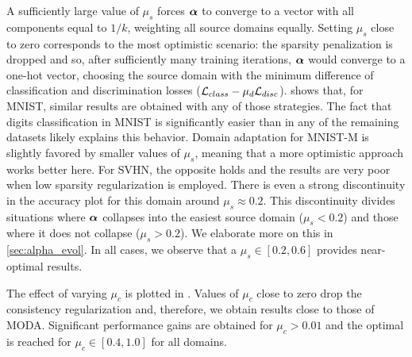 A sufficiently large value of $\mu_s$ forces ${\bm{\alpha}}$ to converge to a vector with all components equal to $1/k$, weighting all source domains equally. Setting $\mu_s$ close to zero corresponds to the most optimistic scenario: the sparsity penalization is dropped and so, after sufficiently many training iterations, ${\bm{\alpha}}$ would converge to a one-hot vector, choosing the source domain with the minimum difference of classification and discrimination losses (${\mathcal{L}}_{class} - \mu_d{\mathcal{L}}_{disc}$).  shows that, for MNIST, similar results are obtained with any of those strategies. The fact that digits classification in MNIST is significantly easier than in any of the remaining datasets likely explains this behavior. Domain adaptation for MNIST-M is slightly favored by smaller values of $\mu_s$, meaning that a more optimistic approach works better here. For SVHN, the opposite holds and the results are very poor when low sparsity regularization is employed. There is even a strong discontinuity in the accuracy plot for this domain around $\mu_s \approx 0.2$. This discontinuity divides situations where ${\bm{\alpha}}$ collapses into the easiest source domain ($\mu_s < 0.2$) and those where it does not collapse ($\mu_s > 0.2$). We elaborate more on this in \ref{sec:alpha_evol}. In all cases, we observe that a $\mu_s \in [0.2, 0.6]$ provides near-optimal results.

The effect of varying $\mu_c$ is plotted in . Values of $\mu_c$ close to zero drop the consistency regularization and, therefore, we obtain results close to those of MODA. Significant performance gains are obtained for $\mu_c > 0.01$ and the optimal is reached for $\mu_c \in [0.4, 1.0]$ for all domains.

